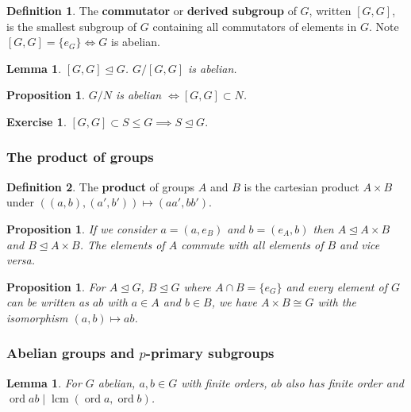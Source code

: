 \documentclass[12pt]{article}
\newtheorem{lem}[thm]{Lemma}
\newtheorem{prop}[thm]{Proposition}
\newtheorem*{prop*}{Proposition}
\theoremstyle{definition}
\newtheorem*{defn*}{Definition}
\newtheorem{exr}[thm]{Exercise}
\newcommand{\normsg}{\trianglelefteq}
\DeclareMathOperator{\ord}{ord}
\DeclareMathOperator{\lcm}{lcm}
\begin{document}
\begin{defn*}
  The \textbf{commutator} or \textbf{derived subgroup} of $G$, written $[G, G]$, is the smallest subgroup of $G$ containing all commutators of elements in $G$.
  Note $[G, G] = \{e_G\} \iff G$ is abelian.
\end{defn*}

\begin{lem}
  $[G, G] \normsg G$.
  $G / [G, G]$ is abelian.
\end{lem}

\begin{prop}
  $G / N$ is abelian $\iff [G, G] \subset N$.
\end{prop}

\begin{exr}
  $[G, G] \subset S \leq G \implies S \normsg G$.
\end{exr}

\subsubsection{The product of groups}

\begin{defn*}
  The \textbf{product} of groups $A$ and $B$ is the cartesian product $A \times B$ under $((a, b), (a', b')) \mapsto (aa', bb')$.
\end{defn*}

\begin{prop*}
  If we consider $a = (a, e_B)$ and $b = (e_A, b)$ then $A \normsg A \times B$ and $B \normsg A \times B$.
  The elements of $A$ commute with all elements of $B$ and vice versa.
\end{prop*}

\begin{prop}
  For $A \normsg G$, $B \normsg G$ where $A \cap B = \{e_G\}$ and every element of $G$ can be written as $ab$ with $a \in A$ and $b \in B$, we have $A \times B \cong G$ with the isomorphism $(a, b) \mapsto ab$.
\end{prop}

\subsubsection{Abelian groups and $p$-primary subgroups}

\begin{lem}
  For $G$ abelian, $a, b \in G$ with finite orders, $ab$ also has finite order and $\ord{ab} \mid \lcm(\ord{a}, \ord{b})$.
\end{lem}
\end{document}
